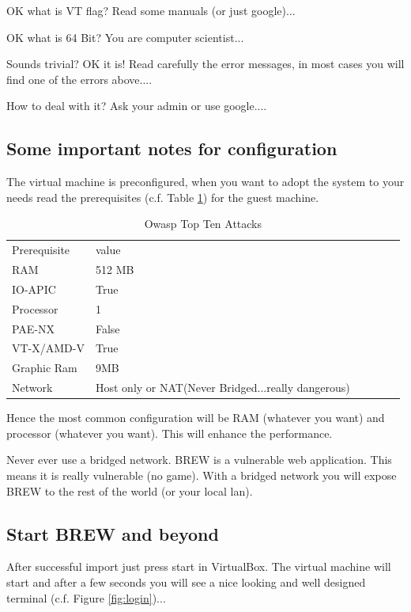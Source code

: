 \documentclass{llncs}%
\begin{document}
OK what is VT flag? Read some manuals (or just google)...

OK what is 64 Bit? You are computer scientist...

Sounds trivial? OK it is! Read carefully the error messages, in most cases you will find one of the errors above....

How to deal with it? Ask your admin or use google....

\subsection{Some important notes for configuration}
The virtual machine is preconfigured, when you want to adopt the system to your needs read the prerequisites (c.f. Table \ref{tab:prereq}) for the guest machine.

\begin{table}
\centering
\caption{Owasp Top Ten Attacks}
\label{tab:prereq}
\begin{tabular}{llllll}
\hline\noalign{\smallskip}
Prerequisite & value\\
\noalign{\smallskip}
\hline
\noalign{\smallskip}
RAM & 512 MB\\
IO-APIC & True\\
Processor & 1\\
PAE-NX & False\\
VT-X/AMD-V & True\\
Graphic Ram & 9MB\\
Network & Host only or NAT(Never Bridged...really dangerous)\\
\hline
\end{tabular}
\end{table}
Hence the most common configuration will be RAM (whatever you want) and processor (whatever you want). This will enhance the performance.

Never ever use a bridged network. BREW is a vulnerable web application. This means it is really vulnerable (no game). With a bridged network you will expose BREW to the rest of the world (or your local lan). 

\subsection{Start BREW and beyond}
After successful import just press start in VirtualBox. The virtual machine will start and after a few seconds you will see a nice looking and well designed terminal (c.f. Figure \ref{fig:login})...
\end{document}
